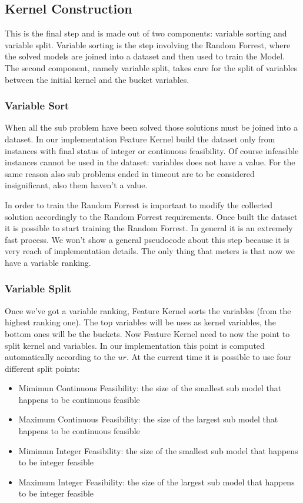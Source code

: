 

\subsection{Kernel Construction}

This is the final step and is  made out of two components: variable sorting and variable split. 
Variable sorting is the step involving   the Random Forrest, where the solved models are joined into a dataset and then used to train the Model. The second component, namely variable split,
takes care for the split of variables between the initial kernel and the bucket variables.

\subsubsection{Variable Sort}
When all the sub problem have been solved those solutions must be joined into a dataset. In our implementation Feature Kernel build the dataset only from instances 
with final status of integer or continuous feasibility. Of course infeasible instances cannot be used in the dataset: variables does not have a value. For the same reason
also sub problems ended in timeout are to be considered insignificant, also them haven't a value.

In order to train the Random Forrest is important to modify the collected solution accordingly to the Random Forrest requirements. Once built the dataset it is possible to 
start training the Random Forrest. In general it is an extremely fast process. We won't show a general pseudocode about this 
step because it is very reach of implementation details. 
The only thing that meters is that now we have a variable ranking.


\subsubsection{Variable Split}
Once we've got a variable ranking, Feature Kernel sorts the variables (from the highest ranking one). The top variables will be uses as kernel variables, the bottom ones will be
the buckets. Now Feature Kernel need to now the point to split kernel and variables. In our implementation this point is computed automatically according to the $ur$. 
At the current time it is possible to use four different split points:
\begin{itemize}
    \item Mimimun Continuous Feasibility: the size of the smallest sub model that happens to be continuous feasible
    \item  Maximum Continuous Feasibility: the size of the largest sub model that happens to be continuous feasible
    \item Mimimun Integer Feasibility: the size of the smallest sub model that happens to be integer feasible
    \item Maximum Integer Feasibility: the size of the largest sub model that happens to be integer feasible
\end{itemize}


